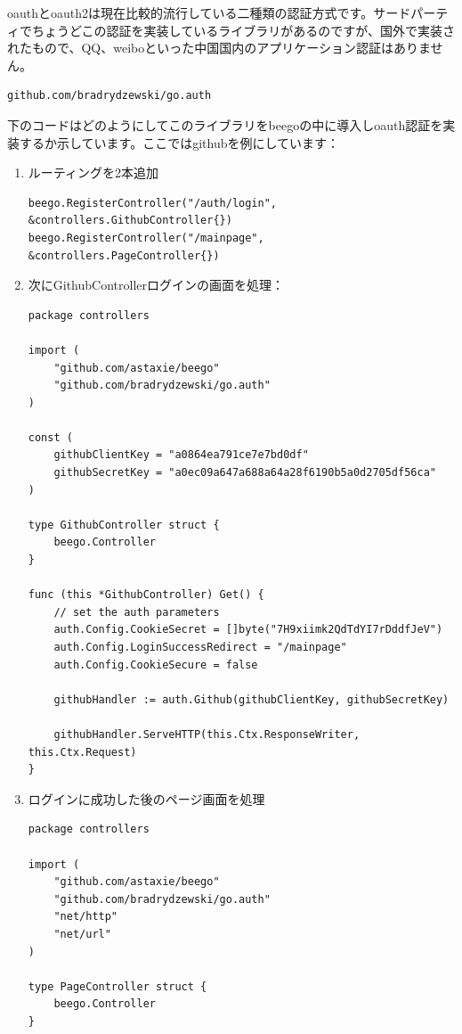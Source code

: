 oauthとoauth2は現在比較的流行している二種類の認証方式です。サードパーティでちょうどこの認証を実装しているライブラリがあるのですが、国外で実装されたもので、QQ、weiboといった中国国内のアプリケーション認証はありません。

\begin{lstlisting}[numbers=none]
github.com/bradrydzewski/go.auth
\end{lstlisting}

下のコードはどのようにしてこのライブラリをbeegoの中に導入しoauth認証を実装するか示しています。ここではgithubを例にしています：


\begin{enumerate}
  \item ルーティングを2本追加
\begin{lstlisting}[numbers=none]
beego.RegisterController("/auth/login", &controllers.GithubController{})
beego.RegisterController("/mainpage", &controllers.PageController{})
\end{lstlisting}
  \item 次にGithubControllerログインの画面を処理：
\begin{lstlisting}[numbers=none]
package controllers

import (
    "github.com/astaxie/beego"
    "github.com/bradrydzewski/go.auth"
)

const (
    githubClientKey = "a0864ea791ce7e7bd0df"
    githubSecretKey = "a0ec09a647a688a64a28f6190b5a0d2705df56ca"
)

type GithubController struct {
    beego.Controller
}

func (this *GithubController) Get() {
    // set the auth parameters
    auth.Config.CookieSecret = []byte("7H9xiimk2QdTdYI7rDddfJeV")
    auth.Config.LoginSuccessRedirect = "/mainpage"
    auth.Config.CookieSecure = false

    githubHandler := auth.Github(githubClientKey, githubSecretKey)

    githubHandler.ServeHTTP(this.Ctx.ResponseWriter, this.Ctx.Request)
}
\end{lstlisting}
  \item ログインに成功した後のページ画面を処理
\begin{lstlisting}[numbers=none]
package controllers

import (
    "github.com/astaxie/beego"
    "github.com/bradrydzewski/go.auth"
    "net/http"
    "net/url"
)

type PageController struct {
    beego.Controller
}


\end{lstlisting}
\end{enumerate}
